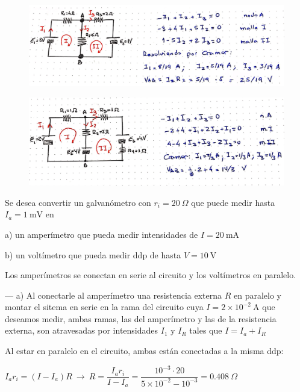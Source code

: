 \begin{figure}[H]
	\centering
	\includegraphics[width=1\textwidth]{imagenes/imagenes25/T25IM10.png}
\end{figure}

\begin{figure}[H]
	\centering
	\includegraphics[width=1\textwidth]{imagenes/imagenes25/T25IM11.png}
\end{figure}


\begin{prob}
Se desea convertir un galvanómetro con $r_i=20\ \Omega$ que puede medir hasta $I_a=1\ \mathrm{mV}$ en

a) un amperímetro que pueda medir intensidades de $I=20\ \mathrm{mA}$

b) un voltímetro que pueda medir ddp de hasta $V=10\ \mathrm{V}$
\end{prob}

Los amperímetros se conectan en serie al circuito y los voltímetros en paralelo.

--- a) Al conectarle al amperímetro una resistencia externa $R$ en paralelo y montar el sitema en serie en  la rama del circuito cuya $I=2\times 10^{-2} \ \mathrm{A}$ que deseamos medir, ambas ramas, las del amperímetro y las de la resistencia externa, son atravesadas por intensidades $I_1 \text{ y } I_R$ tales que $I=I_a+I_R$

Al estar en paralelo en el circuito, ambas están conectadas a la misma ddp:

$I_a r_i =(I-I_a) R \ \to \ R=\dfrac{I_a r_i}{I-I_a}=\dfrac{10^{-3} \cdot 20}{5\times 10^{-2}-10^{-3}}=0.408\ \Omega$

